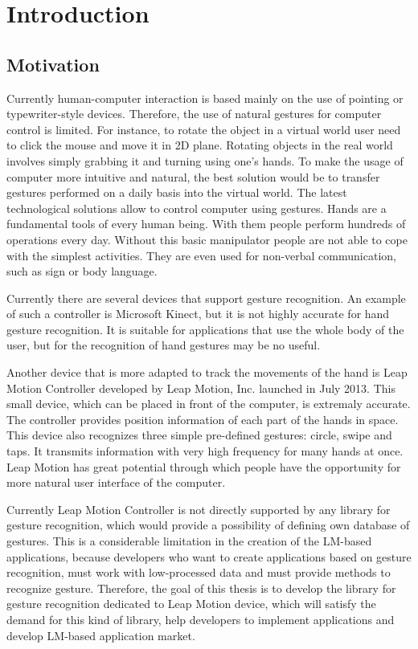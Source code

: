 
\chapter{Introduction} %

\section{Motivation}

Currently human-computer interaction is based mainly on the use of pointing or typewriter-style devices. 
Therefore, the use of natural gestures for computer control is limited. 
For instance, to rotate the object in a virtual world user need to click the mouse and move it in 2D plane. 
Rotating objects in the real world involves simply grabbing it and turning using one's hands. 
To make the usage of computer more intuitive and natural, the best solution would be to transfer gestures performed on a daily basis into the virtual world. 
The latest technological solutions allow to control computer using gestures.
Hands are a fundamental tools of every human being. With them people perform hundreds of operations every day. 
Without this basic manipulator people are not able to cope with the simplest activities. They are even used for non-verbal communication, such as sign or body language.

Currently there are several devices that support gesture recognition. An example of such a controller is Microsoft Kinect, but it is not highly accurate for hand gesture recognition. It is suitable for applications that use the whole body of the user, but for the recognition of hand gestures may be no useful. 

Another device that is more adapted to track the movements of the hand is Leap Motion Controller developed by Leap Motion, Inc. launched in July 2013. This small device, which can be placed in front of the computer, is extremaly accurate. The controller provides position information of each part of the hands in space. This device also recognizes three simple pre-defined gestures: circle, swipe and taps. It transmits information with very high frequency for many hands at once. Leap Motion has great potential through which people have the opportunity for more natural user interface of the computer. 

Currently Leap Motion Controller is not directly supported by any library for gesture recognition, which would provide a possibility of defining own database of gestures. This is a considerable limitation in the creation of the LM-based applications, because developers who want to create applications based on gesture recognition, must work with low-processed data and must provide methods to recognize gesture.
Therefore, the goal of this thesis is to develop the library for gesture recognition dedicated to Leap Motion device, which will satisfy the demand for this kind of library, help developers to implement applications and develop LM-based application market.


